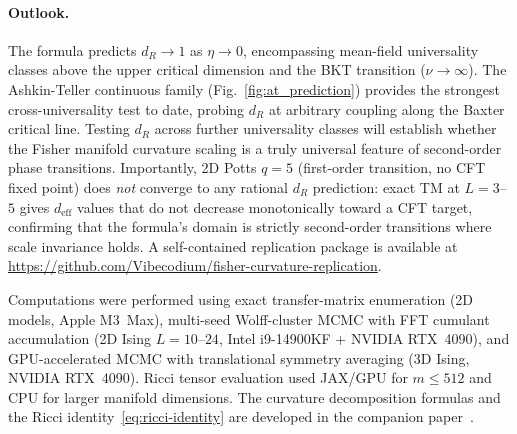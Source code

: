 \documentclass[aps,prl,twocolumn,superscriptaddress,showpacs]{revtex4-2}
\newcommand{\Scal}{R}
\newcommand{\dR}{d_{\Scal}}
\begin{document}
\paragraph{Outlook.}
The formula predicts $\dR \to 1$ as $\eta \to 0$, encompassing mean-field
universality classes above the upper critical dimension and the BKT
transition ($\nu \to \infty$). The Ashkin-Teller continuous family
(Fig.~\ref{fig:at_prediction})
provides the strongest cross-universality test to date, probing
$\dR$ at arbitrary coupling along the Baxter critical line.
Testing $\dR$ across further universality classes will establish whether the
Fisher manifold curvature scaling is a truly universal feature of
second-order phase transitions.
Importantly, 2D Potts $q = 5$ (first-order transition, no CFT fixed point)
does \emph{not} converge to any rational $\dR$ prediction: exact TM at
$L = 3$--$5$ gives $d_\mathrm{eff}$ values that do not decrease
monotonically toward a CFT target, confirming that the formula's domain is
strictly second-order transitions where scale invariance holds.
A self-contained replication package is available at \url{https://github.com/Vibecodium/fisher-curvature-replication}.


\begin{acknowledgments}
Computations were performed using exact transfer-matrix enumeration
(2D models, Apple M3~Max), multi-seed Wolff-cluster MCMC with FFT
cumulant accumulation (2D Ising $L = 10$--$24$, Intel i9-14900KF +
NVIDIA RTX~4090), and GPU-accelerated MCMC with translational symmetry
averaging (3D Ising, NVIDIA RTX~4090). Ricci tensor evaluation used
JAX/GPU for $m \leq 512$ and CPU for larger manifold dimensions.
The curvature decomposition formulas and the Ricci
identity~\eqref{eq:ricci-identity} are developed in the companion
paper~\cite{Paper7}.
\end{acknowledgments}
\end{document}
